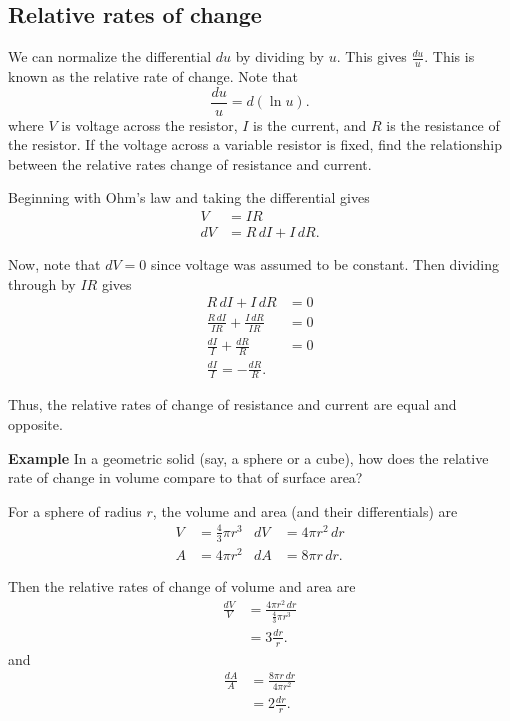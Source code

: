 \documentclass[twoside,openright,titlepage,a4paper]{book}
\begin{document}
\begin{sloppypar}
\subsection{Relative rates of change}
We can normalize the differential $du$ by dividing by $u$. This gives $\frac{du}{u}$. This is known as the relative rate of change. Note that \[\frac{du}{u} = d(\ln u).\] where $V$ is voltage across the resistor, $I$ is the current, and $R$ is the resistance of the resistor. If the voltage across a variable resistor is fixed, find the relationship between the relative rates change of resistance and current.
\begin{examplebox}
Beginning with Ohm's law and taking the differential gives
\begin{align*}
V &= IR \\
dV &= R \, dI + I \, dR. 
\end{align*}

Now, note that $dV = 0$ since voltage was assumed to be constant. Then dividing through by $IR$ gives
\begin{align*}
R \, dI + I \, dR &= 0 \\
\frac{R \, dI}{IR} + \frac{I \, dR}{IR} &= 0 \\
\frac{dI}{I} + \frac{dR}{R} &= 0 \\
\frac{dI}{I} = -\frac{dR}{R}. 
\end{align*}

Thus, the relative rates of change of resistance and current are equal and opposite.	
\end{examplebox}
\bigbreak
\textbf{Example} In a geometric solid (say, a sphere or a cube), how does the relative rate of change in volume compare to that of surface area?
\begin{examplebox}
For a sphere of radius $r$, the volume and area (and their differentials) are
\begin{align*}
V &= \frac{4}{3}\pi r^3 & dV &= 4\pi r^2 \, dr \\
A &= 4\pi r^2 & dA &= 8\pi r \, dr. 
\end{align*}

Then the relative rates of change of volume and area are
\begin{align*}
\frac{dV}{V} &= \frac{4\pi r^2 \, dr}{\frac{4}{3}\pi r^3} \\
&= 3 \frac{dr}{r}.
\end{align*}
and
\begin{align*}
\frac{dA}{A} &= \frac{8 \pi r \, dr}{4 \pi r^2} \\
&= 2 \frac{dr}{r}.
\end{align*}


\end{examplebox}
\end{sloppypar}
\end{document}
